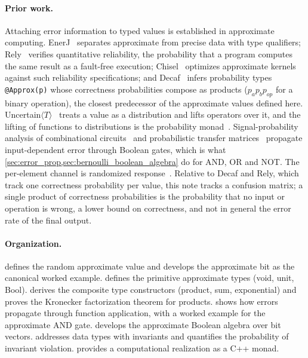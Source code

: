 \documentclass[ ../main.tex]{subfiles}
\begin{document}
\paragraph{Prior work.}
Attaching error information to typed values is established in approximate computing.
EnerJ~\cite{sampson2011enerj} separates approximate from precise data with type qualifiers; Rely~\cite{carbin2013rely} verifies quantitative reliability, the probability that a program computes the same result as a fault-free execution; Chisel~\cite{misailovic2014chisel} optimizes approximate kernels against such reliability specifications; and Decaf~\cite{boston2015decaf} infers probability types \texttt{@Approx(p)} whose correctness probabilities compose as products ($p_a p_b p_{\mathit{op}}$ for a binary operation), the closest predecessor of the approximate values defined here.
Uncertain$\langle T\rangle$~\cite{bornholt2014uncertain} treats a value as a distribution and lifts operators over it, and the lifting of functions to distributions is the probability monad~\cite{giry1982categorical,ramsey2002stochastic}.
Signal-probability analysis of combinational circuits~\cite{parker1975probabilistic} and probabilistic transfer matrices~\cite{krishnaswamy2008ptm} propagate input-dependent error through Boolean gates, which is what \cref{sec:error_prop,sec:bernoulli_boolean_algebra} do for AND, OR and NOT.
The per-element channel is randomized response~\cite{warner1965}.
Relative to Decaf and Rely, which track one correctness probability per value, this note tracks a confusion matrix; a single product of correctness probabilities is the probability that no input or operation is wrong, a lower bound on correctness, and not in general the error rate of the final output.

\paragraph{Organization.}
 defines the random approximate value and develops the approximate bit as the canonical worked example.
 defines the primitive approximate types (void, unit, Bool).
 derives the composite type constructors (product, sum, exponential) and proves the Kronecker factorization theorem for products.
 shows how errors propagate through function application, with a worked example for the approximate AND gate.
 develops the approximate Boolean algebra over bit vectors.
 addresses data types with invariants and quantifies the probability of invariant violation.
 provides a computational realization as a C++ monad.
\end{document}
